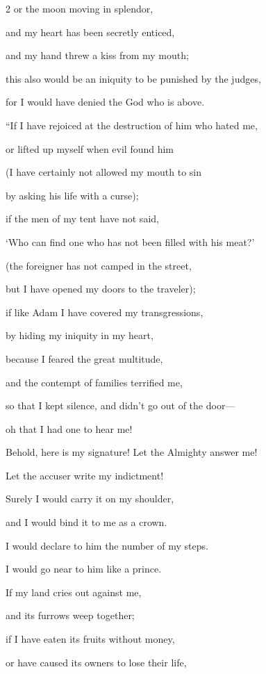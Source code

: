 \begin{multicols}{2}
	or the moon moving in splendor,
	
	\myverse{}and my heart has been secretly enticed,
	
	and my hand threw a kiss from my mouth;
	
	\myverse{}this also would be an iniquity to be punished by the judges,
	
	for I would have denied the God who is above.
	
	\myverse{}“If I have rejoiced at the destruction of him who hated me,
	
	or lifted up myself when evil found him
	
	\myverse{}(I have certainly not allowed my mouth to sin
	
	by asking his life with a curse);
	
	\myverse{}if the men of my tent have not said,
	
	‘Who can find one who has not been filled with his meat?’
	
	\myverse{}(the foreigner has not camped in the street,
	
	but I have opened my doors to the traveler);
	
	\myverse{}if like Adam I have covered my transgressions,
	
	by hiding my iniquity in my heart,
	
	\myverse{}because I feared the great multitude,
	
	and the contempt of families terrified me,
	
	so that I kept silence, and didn’t go out of the door—
	
	\myverse{}oh that I had one to hear me!
	
	Behold, here is my signature! Let the Almighty answer me!
	
	Let the accuser write my indictment!
	
	\myverse{}Surely I would carry it on my shoulder,
	
	and I would bind it to me as a crown.
	
	\myverse{}I would declare to him the number of my steps.
	
	I would go near to him like a prince.
	
	\myverse{}If my land cries out against me,
	
	and its furrows weep together;
	
	\myverse{}if I have eaten its fruits without money,
	
	or have caused its owners to lose their life,
	

\end{multicols}
